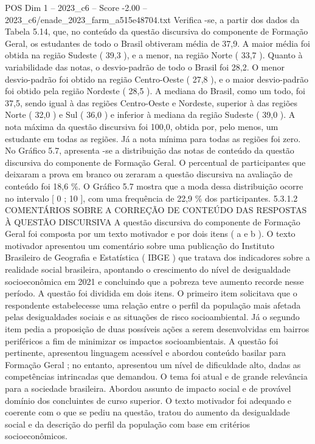 \begin{textsample}{POS Dim 1 – 2023\_c6 – Score -2.00 – 2023\_c6/enade\_2023\_farm\_a515e48704.txt}
Verifica -se, a partir dos dados da Tabela 5.14, que, no conteúdo da questão discursiva do componente de Formação Geral, os estudantes de todo o Brasil obtiveram média de 37,9.
A maior média foi obtida na região Sudeste ( 39,3 ), e a menor, na região Norte ( 33,7 ).
Quanto à variabilidade das notas, o desvio-padrão de todo o Brasil foi 28,2.
O menor desvio-padrão foi obtido na região Centro-Oeste ( 27,8 ), e o maior desvio-padrão foi obtido pela região Nordeste ( 28,5 ).
A mediana do Brasil, como um todo, foi 37,5, sendo igual à das regiões Centro-Oeste e Nordeste, superior à das regiões Norte ( 32,0 ) e Sul ( 36,0 ) e inferior à mediana da região Sudeste ( 39,0 ).
A nota máxima da questão discursiva foi 100,0, obtida por, pelo menos, um estudante em todas as regiões.
Já a nota mínima para todas as regiões foi zero.
No Gráfico 5.7, apresenta -se a distribuição das notas de conteúdo da questão discursiva do componente de Formação Geral.
O percentual de participantes que deixaram a prova em branco ou zeraram a questão discursiva na avaliação de conteúdo foi 18,6 \%.
O Gráfico 5.7 mostra que a moda dessa distribuição ocorre no intervalo [ 0 ; 10 ], com uma frequência de 22,9 \% dos participantes. 5.3.1.2 COMENTÁRIOS SOBRE A CORREÇÃO DE CONTEÚDO DAS RESPOSTAS À QUESTÃO DISCURSIVA A questão discursiva do componente de Formação Geral foi composta por um texto motivador e por dois itens ( a e b ).
O texto motivador apresentou um comentário sobre uma publicação do Instituto Brasileiro de Geografia e Estatística ( IBGE ) que tratava dos indicadores sobre a realidade social brasileira, apontando o crescimento do nível de desigualdade socioeconômica em 2021 e concluindo que a pobreza teve aumento recorde nesse período.
A questão foi dividida em dois itens.
O primeiro item solicitava que o respondente estabelecesse uma relação entre o perfil da população mais afetada pelas desigualdades sociais e as situações de risco socioambiental.
Já o segundo item pedia a proposição de duas possíveis ações a serem desenvolvidas em bairros periféricos a fim de minimizar os impactos socioambientais.
A questão foi pertinente, apresentou linguagem acessível e abordou conteúdo basilar para Formação Geral ; no entanto, apresentou um nível de dificuldade alto, dadas as competências intrincadas que demandou.
O tema foi atual e de grande relevância para a sociedade brasileira.
Abordou assunto de impacto social e de provável domínio dos concluintes de curso superior.
O texto motivador foi adequado e coerente com o que se pediu na questão, tratou do aumento da desigualdade social e da descrição do perfil da população com base em critérios socioeconômicos.

\end{textsample}
